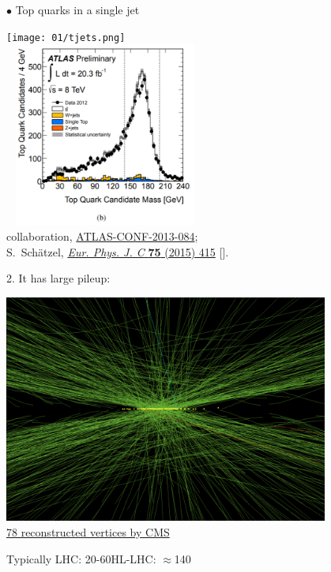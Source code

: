 \documentclass[9pt,a4paper,unknownkeysallowed,xcolor=dvipsnames,aspectratio=43]{beamer}
\begin{document}
\begin{frame}

\vspace{2mm}
{\color{darkred}\Large$\bullet$} Top quarks in a single jet
\vspace{2mm}
\begin{center}
\texttt{[image: 01/tjets.png]}\\\
\vspace{2mm}
\includegraphics[width=0.45\textwidth]{05/tJet.png}\\%
{\tiny \color{darkblue}{\scshape ATlAS} collaboration, %
\href{https://cds.cern.ch/record/1571040}{ATLAS-CONF-2013-084};\\
S.~Sch\"atzel, %
  \href{https://doi.org/10.1140/epjc/s10052-015-3636-x}{\emph{Eur. Phys. J. C}
  {\bfseries 75} (2015) 415} [\href{https://arxiv.org/abs/1403.5176}{{\ttfamily
  1403.5176}}].}
\end{center}
\end{frame}
%
%
%
\begin{frame}

\vspace{2mm}
2. It has large pileup:
\vspace{2mm}
\begin{center}
\includegraphics[width=0.8\textwidth]{05/78pileup.png}\\\vspace{2mm}
{\tiny \color{darkblue}\href{https://cds.cern.ch/record/1479324}{78 reconstructed vertices by CMS}
}\vspace{2mm}

Typically LHC: 20-60\qquad HL-LHC: $\approx$140
\end{center}
\end{frame}
\end{document}
